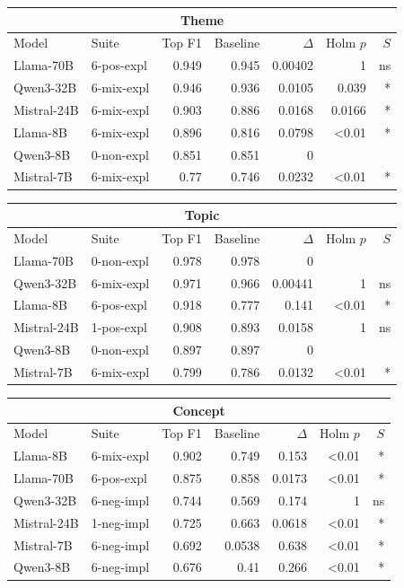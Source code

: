 \begin{table}
    \centering
    \scriptsize

    \begin{tabular}{ll|rrrrr}
    \toprule
    \multicolumn{7}{c}{\textbf{Theme}} \\
    \midrule
    Model & Suite & Top F1 & Baseline & $\Delta$ & Holm $p$ & $S$ \\
    \midrule
    Llama-70B & 6-pos-expl & 0.949 & 0.945 & 0.00402 & 1 & ns \\
    Qwen3-32B & 6-mix-expl & 0.946 & 0.936 & 0.0105 & 0.039 & * \\
    Mistral-24B & 6-mix-expl & 0.903 & 0.886 & 0.0168 & 0.0166 & * \\
    Llama-8B & 6-mix-expl & 0.896 & 0.816 & 0.0798 & <0.01 & * \\
    Qwen3-8B & 0-non-expl & 0.851 & 0.851 & 0 &  &  \\
    Mistral-7B & 6-mix-expl & 0.77 & 0.746 & 0.0232 & <0.01 & * \\
    \bottomrule
    \end{tabular}
    
    \begin{tabular}{ll|rrrrr}
    \toprule
    \multicolumn{7}{c}{\textbf{Topic}} \\
    \midrule
    Model & Suite & Top F1 & Baseline & $\Delta$ & Holm $p$ & $S$ \\
    \midrule
    Llama-70B & 0-non-expl & 0.978 & 0.978 & 0 &  &  \\
    Qwen3-32B & 6-mix-expl & 0.971 & 0.966 & 0.00441 & 1 & ns \\
    Llama-8B & 6-pos-expl & 0.918 & 0.777 & 0.141 & <0.01 & * \\
    Mistral-24B & 1-pos-expl & 0.908 & 0.893 & 0.0158 & 1 & ns \\
    Qwen3-8B & 0-non-expl & 0.897 & 0.897 & 0 &  &  \\
    Mistral-7B & 6-mix-expl & 0.799 & 0.786 & 0.0132 & <0.01 & * \\
    \bottomrule
    \end{tabular}
    
    \begin{tabular}{ll|rrrrr}
    \toprule
    \multicolumn{7}{c}{\textbf{Concept}} \\    
    \midrule
    Model & Suite & Top F1 & Baseline & $\Delta$ & Holm $p$ & $S$ \\
    \midrule
    Llama-8B & 6-mix-expl & 0.902 & 0.749 & 0.153 & <0.01 & * \\
    Llama-70B & 6-pos-expl & 0.875 & 0.858 & 0.0173 & <0.01 & * \\
    Qwen3-32B & 6-neg-impl & 0.744 & 0.569 & 0.174 & 1 & ns \\
    Mistral-24B & 1-neg-impl & 0.725 & 0.663 & 0.0618 & <0.01 & * \\
    Mistral-7B & 6-neg-impl & 0.692 & 0.0538 & 0.638 & <0.01 & * \\
    Qwen3-8B & 6-neg-impl & 0.676 & 0.41 & 0.266 & <0.01 & * \\
    \bottomrule
    \end{tabular}
    

\end{table}
